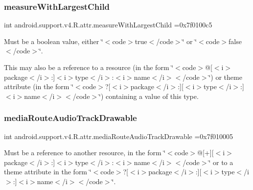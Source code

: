 \subsubsection{\texorpdfstring{measure\+With\+Largest\+Child}{measureWithLargestChild}}
{\footnotesize\ttfamily int android.\+support.\+v4.\+R.\+attr.\+measure\+With\+Largest\+Child =0x7f0100c5\hspace{0.3cm}{\ttfamily [static]}}

Must be a boolean value, either \char`\"{}$<$code$>$true$<$/code$>$\char`\"{} or \char`\"{}$<$code$>$false$<$/code$>$\char`\"{}. 

This may also be a reference to a resource (in the form \char`\"{}$<$code$>$@\mbox{[}$<$i$>$package$<$/i$>$\+:\mbox{]}$<$i$>$type$<$/i$>$\+:$<$i$>$name$<$/i$>$$<$/code$>$\char`\"{}) or theme attribute (in the form \char`\"{}$<$code$>$?\mbox{[}$<$i$>$package$<$/i$>$\+:\mbox{]}\mbox{[}$<$i$>$type$<$/i$>$\+:\mbox{]}$<$i$>$name$<$/i$>$$<$/code$>$\char`\"{}) containing a value of this type. \mbox{\label{classandroid_1_1support_1_1v4_1_1R_1_1attr_a8a7b4a004619085258ac2ba5cf483af6}} 
\subsubsection{\texorpdfstring{media\+Route\+Audio\+Track\+Drawable}{mediaRouteAudioTrackDrawable}}
{\footnotesize\ttfamily int android.\+support.\+v4.\+R.\+attr.\+media\+Route\+Audio\+Track\+Drawable =0x7f010005\hspace{0.3cm}{\ttfamily [static]}}

Must be a reference to another resource, in the form \char`\"{}$<$code$>$@\mbox{[}+\mbox{]}\mbox{[}$<$i$>$package$<$/i$>$\+:\mbox{]}$<$i$>$type$<$/i$>$\+:$<$i$>$name$<$/i$>$$<$/code$>$\char`\"{} or to a theme attribute in the form \char`\"{}$<$code$>$?\mbox{[}$<$i$>$package$<$/i$>$\+:\mbox{]}\mbox{[}$<$i$>$type$<$/i$>$\+:\mbox{]}$<$i$>$name$<$/i$>$$<$/code$>$\char`\"{}. \mbox{\label{classandroid_1_1support_1_1v4_1_1R_1_1attr_a7edac0f4a8fce3ba05eb1110b3842e12}} 
